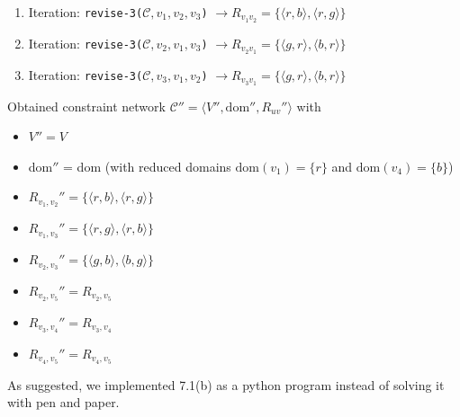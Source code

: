 \documentclass{article} %
\begin{document}
\begin{enumerate}[(a)]
\begin{enumerate}[1.]
        $\rightarrow R_{v_1 v_3} = \{
            \langle r, g \rangle,
            \langle r, b \rangle
        \}$
        \item Iteration: \texttt{revise-3($\mathcal{C}, v_1, v_2, v_3$)}
        $\rightarrow R_{v_1 v_2} = \{
            \langle r, b \rangle,
            \langle r, g \rangle
        \}$
        \item Iteration: \texttt{revise-3($\mathcal{C}, v_2, v_1, v_3$)}
        $\rightarrow R_{v_2 v_1} = \{
            \langle g, r \rangle,
            \langle b, r \rangle
        \}$
        \item Iteration: \texttt{revise-3($\mathcal{C}, v_3, v_1, v_2$)}
        $\rightarrow R_{v_3 v_1} = \{
            \langle g, r \rangle,
            \langle b, r \rangle
        \}$
    \end{enumerate}
    Obtained constraint network $\mathcal{C}''
    = \langle V'', \text{dom}'', R_{uv}'' \rangle $ with
    \begin{itemize}
        \item $V'' = V$
        \item dom$''$ = dom (with reduced domains
        $\text{dom}(v_1) = \{ r \}$ and
        $\text{dom}(v_4) = \{ b \}$)
        \item $R_{v_1, v_2}'' = \{
            \langle r, b \rangle,
            \langle r, g \rangle
        \}$
        \item $R_{v_1, v_3}'' = \{
            \langle r, g \rangle,
            \langle r, b \rangle
        \}$
        \item $R_{v_2, v_3}'' = \{
            \langle g, b \rangle,
            \langle b, g \rangle
        \}$
        \item $R_{v_2, v_5}'' = R_{v_2, v_5}$
        \item $R_{v_3, v_4}'' = R_{v_3, v_4}$
        \item $R_{v_4, v_5}'' = R_{v_4, v_5}$
    \end{itemize}
    As suggested, we implemented 7.1(b) as a python program
    instead of solving it with pen and paper.
\end{enumerate}

\newpage
\end{document}
